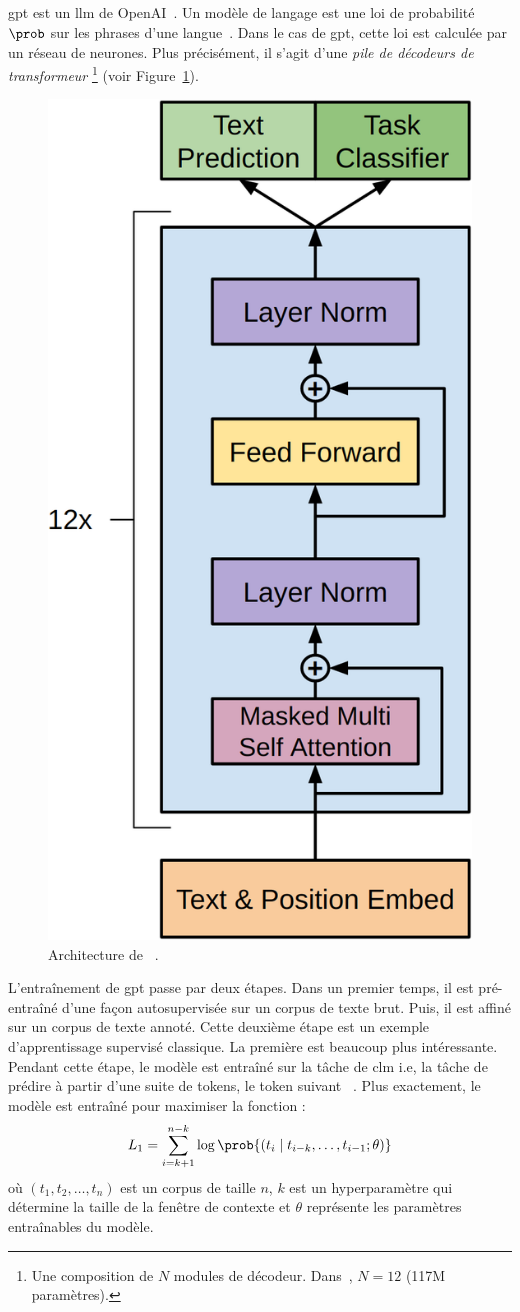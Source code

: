 \subsection{}

\Gls{gpt} est un \gls{llm} de OpenAI~\cite{Radford_Narasimhan_Salimans_Sutskever}.
Un modèle de langage est une loi de probabilité \(\prob\) sur les phrases d'une langue~\cite{routledge}.
Dans le cas de \gls{gpt}, cette loi est calculée par un réseau de neurones.
Plus précisément, il s'agit d'une \emph{pile de décodeurs de transformeur}%
\footnote{%
    Une composition de \(N\) modules de décodeur. 
    Dans~\cite{Radford_Narasimhan_Salimans_Sutskever}, \(N=12\)
    (117M paramètres).
} (voir Figure~\ref{fig.gpt}).

\begin{figure}[hbt]
    \centering
    \includegraphics[height=.5\linewidth]{assets/images/gpt.png}
    \caption[Architecture de .]%
    {Architecture de ~\cite{Radford_Narasimhan_Salimans_Sutskever}.}
    \label{fig.gpt}
\end{figure}

L'entraînement de \gls{gpt} passe par deux étapes.
Dans un premier temps, il est pré-entraîné d'une façon autosupervisée sur un corpus de texte brut.
Puis, il est affiné sur un corpus de texte annoté.
Cette deuxième étape est un exemple d'apprentissage supervisé classique.
La première est beaucoup plus intéressante.
Pendant cette étape, le modèle est entraîné sur la tâche de \gls{clm}
i.e, la tâche de prédire à partir d'une suite de tokens, le token suivant%
~\cite{Radford_Narasimhan_Salimans_Sutskever}.
Plus exactement, le modèle est entraîné pour maximiser la fonction :
\begin{equation}
    \label{eq.gpt-pretrain-loss}
    L_1=\sum_{i=k+1}^{n-k} \log\prob{\left(t_i \mid t_{i-k}, \ldots, t_{i-1} ; \theta\right)}
\end{equation}
où \(\left(t_1, t_2, \ldots, t_n\right)\) est un corpus de taille \(n\), 
\(k\) est un hyperparamètre qui détermine la taille de la fenêtre de contexte
et \(\theta\) représente les paramètres entraînables du modèle.

